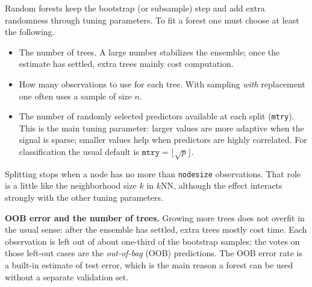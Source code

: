 \documentclass[
]{book}
\providecommand{\tightlist}{%
  \setlength{\itemsep}{0pt}\setlength{\parskip}{0pt}}
\begin{document}
Random forests keep the bootstrap (or subsample) step and add extra randomness through tuning parameters. To fit a forest one must choose at least the following.

\begin{itemize}
\tightlist
\item
  The number of trees. A large number stabilizes the ensemble; once the estimate has settled, extra trees mainly cost computation.
\item
  How many observations to use for each tree. With sampling \emph{with} replacement one often uses a sample of size \(n\).
\item
  The number of randomly selected predictors available at each split (\texttt{mtry}). This is the main tuning parameter: larger values are more adaptive when the signal is sparse; smaller values help when predictors are highly correlated. For classification the usual default is \(\texttt{mtry}=\lfloor\sqrt{p}\rfloor\).
\end{itemize}

Splitting stops when a node has no more than \texttt{nodesize} observations. That role is a little like the neighborhood size \(k\) in \(k\)NN, although the effect interacts strongly with the other tuning parameters.

\textbf{OOB error and the number of trees.} Growing more trees does not overfit in the usual sense: after the ensemble has settled, extra trees mostly cost time. Each observation is left out of about one-third of the bootstrap samples; the votes on those left-out cases are the \emph{out-of-bag} (OOB) predictions. The OOB error rate is a built-in estimate of test error, which is the main reason a forest can be used without a separate validation set.
\end{document}
